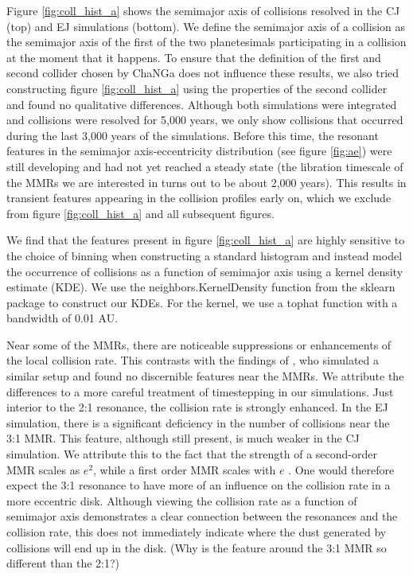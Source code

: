 \documentclass[onecolumn]{aastex63}
\begin{document}
Figure \ref{fig:coll_hist_a} shows the semimajor axis of collisions resolved in the CJ (top) and EJ simulations (bottom). We define 
the semimajor axis of a collision as the semimajor axis of the first of the two planetesimals participating in a collision at the 
moment that it happens. To ensure that the definition of the first and second collider chosen by {\sc ChaNGa} does not influence 
these results, we also tried constructing figure \ref{fig:coll_hist_a} using the properties of the second collider and found no qualitative 
differences. Although both simulations were integrated and collisions were resolved for 5,000 years, we only show collisions that occurred 
during the last 3,000 years of the simulations. Before this time, the resonant features in the semimajor axis-eccentricity distribution (see 
figure \ref{fig:ae}) were still developing and had not yet reached a steady state (the libration timescale of the MMRs we are interested in 
turns out to be about 2,000 years). This results in transient features appearing in the collision profiles early on, which we exclude from 
figure \ref{fig:coll_hist_a} and all subsequent figures.

We find that the features present in figure \ref{fig:coll_hist_a} are highly sensitive to the choice of binning when constructing a standard 
histogram and instead model the occurrence of collisions as a function of semimajor axis using a kernel density estimate (KDE). We use 
the {\sc neighbors.KernelDensity} function from the {\sc sklearn} \citep{scikit-learn} package to construct our KDEs. For the kernel, we use 
a tophat function with a bandwidth of 0.01 AU.

Near some of the MMRs, there are noticeable suppressions or enhancements of the local collision rate. This contrasts with the findings of 
\citet{2000Icar..143...45R}, who simulated a similar setup and found no discernible features near the MMRs. We attribute the differences to 
a more careful treatment of timestepping in our simulations. Just interior to the 2:1 resonance, the collision rate is strongly enhanced. In the 
EJ simulation, there is a significant deficiency in the number of collisions near the 3:1 MMR. This feature, although still present, is much 
weaker in the CJ simulation. We attribute this to the fact that the strength of a second-order MMR scales as $e^{2}$, while a first order 
MMR scales with $e$ \citep{1994PhyD...77..289M}. One would therefore expect the 3:1 resonance to have more of an influence on the 
collision rate in a more eccentric disk. Although viewing the collision rate as a function of semimajor axis demonstrates a clear connection 
between the resonances and the collision rate, this does not immediately indicate where the dust generated by collisions will end up in the 
disk. (Why is the feature around the 3:1 MMR so different than the 2:1?)
\end{document}
